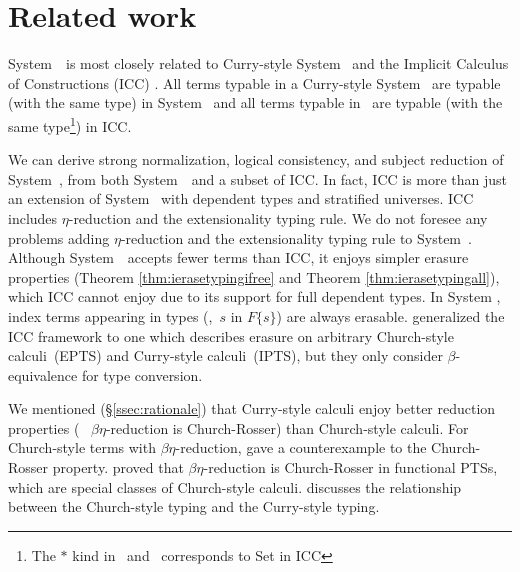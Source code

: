 \section{Related work}
\label{sec:relwork}
System~\Fi\ is most closely related to
Curry-style System~\Fw \cite{AbeMatUus03,AbeMatUus05,GHR93}
and the Implicit Calculus of Constructions (ICC) \cite{Miquel01}.
All terms typable in a Curry-style System \Fw\ are typable (with the same type) in System \Fi\ 
and all terms typable in \Fi\ are typable (with the same type\footnote{The $*$ kind in \Fw\ and \Fi\ corresponds
	to \textsf{Set} in ICC}) in ICC.

We can derive strong normalization, logical consistency,
and subject reduction of System~\Fi, from both System~\Fw\ and a subset of ICC.
In fact, ICC is more than just an extension of System~\Fi
with dependent types and stratified universes. ICC includes
$\eta$-reduction
and the extensionality typing rule. We do not foresee any problems adding
$\eta$-reduction and the extensionality typing rule to System~\Fi. Although
System~\Fi\ accepts fewer terms than ICC, it enjoys simpler
erasure properties (Theorem \ref{thm:ierasetypingifree} and
Theorem \ref{thm:ierasetypingall}), which ICC cannot enjoy
due to its support for full dependent types. In System \Fi, index terms
appearing in types (\eg,~$s$ in $F\{s\}$) are always erasable.
\citet{LingerS08} generalized the ICC framework to one which describes
erasure on arbitrary Church-style calculi~(EPTS) and Curry-style
calculi~(IPTS), but they only consider $\beta$-equivalence for type conversion.

We mentioned (\S\ref{ssec:rationale}) that Curry-style calculi enjoy
better reduction properties (\eg ~ $\beta\eta$-reduction is Church-Rosser)
than Church-style calculi. For Church-style terms with $\beta\eta$-reduction, \citet{Nederpelt73} gave a counterexample to
the Church-Rosser property.
\citet{Geuvers92} proved that $\beta\eta$-reduction is Church-Rosser
in functional PTSs, which are special classes of Church-style calculi.
\citet{Seldin08} discusses the relationship between the Church-style typing
and the Curry-style typing.

